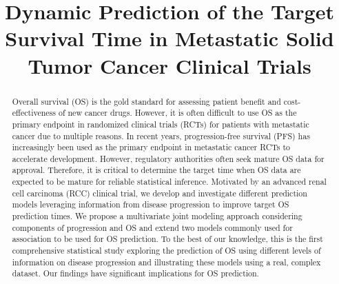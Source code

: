 \documentclass[aoas]{imsart}
\theoremstyle{plain}
\theoremstyle{remark}
\begin{document}
\begin{frontmatter}
\title{Dynamic Prediction of the Target Survival Time in Metastatic Solid Tumor Cancer Clinical Trials}


\begin{abstract}
Overall survival (OS) is the gold standard for assessing patient benefit and cost-effectiveness of new cancer drugs. However, it is often difficult to use OS as the primary endpoint in randomized clinical trials (RCTs) for patients with metastatic cancer due to multiple reasons. In recent years, progression-free survival (PFS) has increasingly been used as the primary endpoint in metastatic cancer RCTs to accelerate development. However, regulatory authorities often seek mature OS data for approval. Therefore, it is critical to determine the target time when OS data are expected to be mature for reliable statistical inference. Motivated by an advanced renal cell carcinoma (RCC) clinical trial, we develop and investigate different prediction models leveraging information from disease progression to improve target OS prediction times. We propose a multivariate joint modeling approach considering components of progression and OS and extend two models commonly used for association to be used for OS prediction. To the best of our knowledge, this is the first comprehensive statistical study exploring the prediction of OS using different levels of information on disease progression and illustrating these models using a real, complex dataset. Our findings have significant implications for OS prediction.
\end{abstract}


\end{frontmatter}
\end{document}
